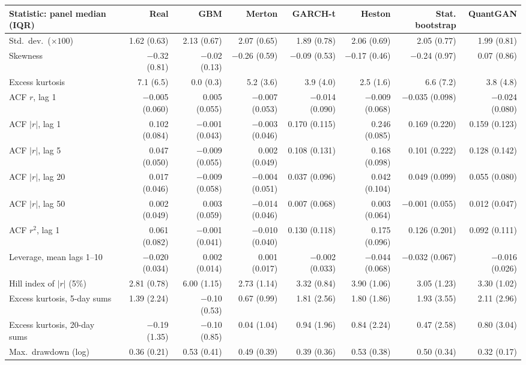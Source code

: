 \begin{tabular}{lrrrrrrr}
\toprule
Statistic: panel median (IQR) & Real & GBM & Merton & GARCH-t & Heston & Stat. bootstrap & QuantGAN \\
\midrule
Std.\ dev.\ ($\times 100$) & 1.62 (0.63) & 2.13 (0.67) & 2.07 (0.65) & 1.89 (0.78) & 2.06 (0.69) & 2.05 (0.77) & 1.99 (0.81) \\
Skewness & $-$0.32 (0.81) & $-$0.02 (0.13) & $-$0.26 (0.59) & $-$0.09 (0.53) & $-$0.17 (0.46) & $-$0.24 (0.97) & 0.07 (0.86) \\
Excess kurtosis & 7.1 (6.5) & 0.0 (0.3) & 5.2 (3.6) & 3.9 (4.0) & 2.5 (1.6) & 6.6 (7.2) & 3.8 (4.8) \\
ACF $r$, lag 1 & $-$0.005 (0.060) & 0.005 (0.055) & $-$0.007 (0.053) & $-$0.014 (0.090) & $-$0.009 (0.068) & $-$0.035 (0.098) & $-$0.024 (0.080) \\
ACF $|r|$, lag 1 & 0.102 (0.084) & $-$0.001 (0.043) & $-$0.003 (0.046) & 0.170 (0.115) & 0.246 (0.085) & 0.169 (0.220) & 0.159 (0.123) \\
ACF $|r|$, lag 5 & 0.047 (0.050) & $-$0.009 (0.055) & 0.002 (0.049) & 0.108 (0.131) & 0.168 (0.098) & 0.101 (0.222) & 0.128 (0.142) \\
ACF $|r|$, lag 20 & 0.017 (0.046) & $-$0.009 (0.058) & $-$0.004 (0.051) & 0.037 (0.096) & 0.042 (0.104) & 0.049 (0.099) & 0.055 (0.080) \\
ACF $|r|$, lag 50 & 0.002 (0.049) & 0.003 (0.059) & $-$0.014 (0.046) & 0.007 (0.068) & 0.003 (0.064) & $-$0.001 (0.055) & 0.012 (0.047) \\
ACF $r^2$, lag 1 & 0.061 (0.082) & $-$0.001 (0.041) & $-$0.010 (0.040) & 0.130 (0.118) & 0.175 (0.096) & 0.126 (0.201) & 0.092 (0.111) \\
Leverage, mean lags 1--10 & $-$0.020 (0.034) & 0.002 (0.014) & 0.001 (0.017) & $-$0.002 (0.033) & $-$0.044 (0.068) & $-$0.032 (0.067) & $-$0.016 (0.026) \\
Hill index of $|r|$ (5\%) & 2.81 (0.78) & 6.00 (1.15) & 2.73 (1.14) & 3.32 (0.84) & 3.90 (1.06) & 3.05 (1.23) & 3.30 (1.02) \\
Excess kurtosis, 5-day sums & 1.39 (2.24) & $-$0.10 (0.53) & 0.67 (0.99) & 1.81 (2.56) & 1.80 (1.86) & 1.93 (3.55) & 2.11 (2.96) \\
Excess kurtosis, 20-day sums & $-$0.19 (1.35) & $-$0.10 (0.85) & 0.04 (1.04) & 0.94 (1.96) & 0.84 (2.24) & 0.47 (2.58) & 0.80 (3.04) \\
Max.\ drawdown (log) & 0.36 (0.21) & 0.53 (0.41) & 0.49 (0.39) & 0.39 (0.36) & 0.53 (0.38) & 0.50 (0.34) & 0.32 (0.17) \\
\bottomrule
\end{tabular}
